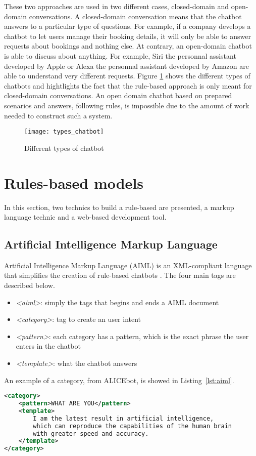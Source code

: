 These two approaches are used in two different cases, closed-domain and open-domain conversations. A closed-domain conversation means that the chatbot answers to a particular type of questions. For example, if a company develops a chatbot to let users manage their booking details, it will only be able to answer requests about bookings and nothing else. At contrary, an open-domain chatbot is able to discuss about anything. For example, Siri the personnal assistant developed by Apple or Alexa the personnal assistant developed by Amazon are able to understand very different requests. Figure \ref{fig:types_chatbot} shows the different types of chatbots and hightlights the fact that the rule-based approach is only meant for closed-domain conversations. An open domain chatbot based on prepared scenarios and answers, following rules, is impossible due to the amount of work needed to construct such a system.

\begin{figure}
    \centering
    \texttt{[image: types\_chatbot]}
    \decoRule
    \caption{Different types of chatbot}
    \label{fig:types_chatbot}
\end{figure}

\section{Rules-based models}
In this section, two technics to build a rule-based are presented, a markup language technic and a web-based development tool.

\subsection{Artificial Intelligence Markup Language}
Artificial Intelligence Markup Language (AIML) is an XML-compliant language that simplifies the creation of rule-based chatbots \citep{wallace2005aiml}. The four main tags are described below.
\begin{itemize}
    \item \textit{<aiml>}: simply the tags that begins and ends a AIML document
    \item \textit{<category>}: tag to create an user intent
    \item \textit{<pattern>}: each category has a pattern, which is the exact phrase the user enters in the chatbot
    \item \textit{<template>}: what the chatbot answers
\end{itemize}
An example of a category, from ALICEbot, is showed in Listing~\ref{lst:aiml}.
\begin{lstlisting}[language=XML, label={lst:aiml}]
<category>
    <pattern>WHAT ARE YOU</pattern>
    <template>
        I am the latest result in artificial intelligence,
        which can reproduce the capabilities of the human brain
        with greater speed and accuracy.
    </template>
</category>
\end{lstlisting}

